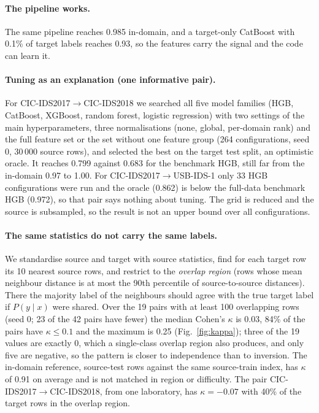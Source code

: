 \documentclass[pdflatex,sn-mathphys-num]{sn-jnl}%
\begin{document}
\paragraph{The pipeline works.}
The same pipeline reaches 0.985 in-domain, and a target-only CatBoost with 0.1\% of target labels reaches 0.93, so the features carry the signal and the code can learn it.

\paragraph{Tuning as an explanation (one informative pair).}
For CIC-IDS2017$\rightarrow$CIC-IDS2018 we searched all five model families (HGB, CatBoost, XGBoost, random forest, logistic regression) with two settings of the main hyperparameters, three normalisations (none, global, per-domain rank) and the full feature set or the set without one feature group (264 configurations, seed 0, 30\,000 source rows), and selected the best on the target test split, an optimistic oracle.
It reaches 0.799 against 0.683 for the benchmark HGB, still far from the in-domain 0.97 to 1.00.
For CIC-IDS2017$\rightarrow$USB-IDS-1 only 33 HGB configurations were run and the oracle (0.862) is below the full-data benchmark HGB (0.972), so that pair says nothing about tuning.
The grid is reduced and the source is subsampled, so the result is not an upper bound over all configurations.

\paragraph{The same statistics do not carry the same labels.}
We standardise source and target with source statistics, find for each target row its 10 nearest source rows, and restrict to the \emph{overlap region} (rows whose mean neighbour distance is at most the 90th percentile of source-to-source distances).
There the majority label of the neighbours should agree with the true target label if $P(y\mid x)$ were shared.
Over the 19 pairs with at least 100 overlapping rows (seed 0; 23 of the 42 pairs have fewer) the median Cohen's $\kappa$ is 0.03, 84\% of the pairs have $\kappa\le0.1$ and the maximum is 0.25 (Fig.~\ref{fig:kappa}); three of the 19 values are exactly 0, which a single-class overlap region also produces, and only five are negative, so the pattern is closer to independence than to inversion. The in-domain reference, source-test rows against the same source-train index, has $\kappa$ of 0.91 on average and is not matched in region or difficulty.
The pair CIC-IDS2017$\rightarrow$CIC-IDS2018, from one laboratory, has $\kappa=-0.07$ with 40\% of the target rows in the overlap region.
\end{document}
